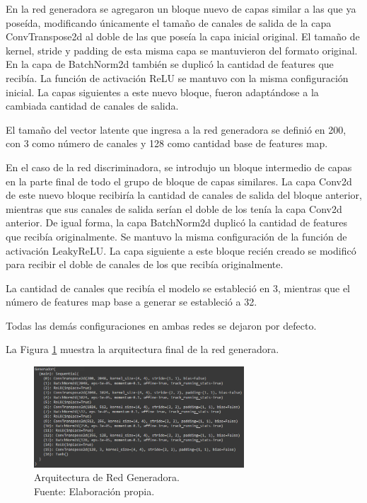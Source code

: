 En la red generadora se agregaron un bloque nuevo de capas similar a las que ya poseída, modificando únicamente el tamaño de canales de salida de la capa ConvTranspose2d al doble de las que poseía la capa inicial original. El tamaño de kernel, stride y padding de esta misma capa se mantuvieron del formato original. En la capa de BatchNorm2d también se duplicó la cantidad de features que recibía. La función de activación ReLU se mantuvo con la misma configuración inicial. La capas siguientes a este nuevo bloque, fueron adaptándose a la cambiada cantidad de canales de salida.

El tamaño del vector latente que ingresa a la red generadora se definió en 200, con 3 como número de canales y 128 como cantidad base de features map.

En el caso de la red discriminadora, se introdujo un bloque intermedio de capas en la parte final de todo el grupo de bloque de capas similares. La capa Conv2d de este nuevo bloque recibiría la cantidad de canales de salida del bloque anterior, mientras que sus canales de salida serían el doble de los tenía la capa Conv2d anterior. De igual forma, la capa BatchNorm2d  duplicó la cantidad de features que recibía originalmente. Se mantuvo la misma configuración de la función de activación LeakyReLU. La capa siguiente a este bloque recién creado se modificó para recibir el doble de canales de los que recibía originalmente.

La cantidad de canales que recibía el modelo se estableció en 3, mientras que el número de features map base a generar se estableció a 32.

Todas las demás configuraciones en ambas redes se dejaron por defecto.

La Figura \ref{4:fig111} muestra la arquitectura final de la red generadora.

\begin{figure}[H]
	\begin{center}
		\includegraphics[width=0.70\textwidth]{4/figures/generator_network.PNG}
		\caption[Arquitectura de Red Generadora]{Arquitectura de Red Generadora. \\
		Fuente: Elaboración propia.}
		\label{4:fig111}
	\end{center}
\end{figure}


